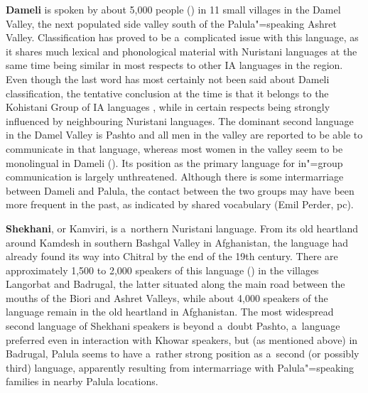 \textbf{Dameli} is spoken by about 5,000 people (\citealt{decker1992a}) in 11 small villages in the Damel Valley, the next populated side valley south of the Palula"=speaking Ashret Valley. Classification has proved to be a~complicated issue with this language, as it shares much lexical and phonological material with Nuristani languages at the same time being similar in most respects to other IA languages in the region. Even though the last word has most certainly not been said about Dameli classification, the tentative conclusion at the time is that it belongs to the Kohistani Group of IA languages \citep[258]{strand2001}, while in certain respects being strongly influenced by neighbouring Nuristani languages. The dominant second language in the Damel Valley is Pashto and all men in the valley are reported to be able to communicate in that language, whereas most women in the valley seem to be monolingual in Dameli (\citealt{decker1992a}). Its position as the primary language for in"=group communication is largely unthreatened. Although there is some intermarriage between Dameli and Palula, the contact between the two groups may have been more frequent in the past, as indicated by shared vocabulary (Emil Perder, pc).


\textbf{Shekhani}, or Kamviri, is a~northern Nuristani language. From its old heartland around Kamdesh in southern Bashgal Valley in Afghanistan, the language had already found its way into Chitral by the end of the 19th century. There are approximately 1,500 to 2,000 speakers of this language (\citealt{decker1992a}) in the villages Langorbat and Badrugal, the latter situated along the main road between the mouths of the Biori and Ashret Valleys, while about 4,000 speakers of the language remain in the old heartland in Afghanistan. The most widespread second language of Shekhani speakers is beyond a~doubt Pashto, a~language preferred even in interaction with Khowar speakers, but (as mentioned above) in Badrugal, Palula seems to have a~rather strong position as a~second (or possibly third) language, apparently resulting from intermarriage with Palula"=speaking families in nearby Palula locations.


